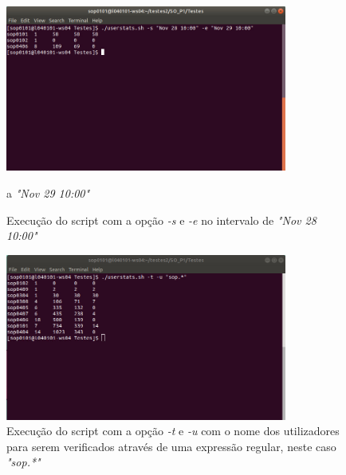 \documentclass[10pt,portuguese]{article}
\begin{document}
\begin{figure}[!h]
    \centering
    \includegraphics[width=350]{Resultados/user_s_e.jpeg}
    \caption{Execução do script com a opção \textit{-s} e \textit{-e} no intervalo de \textit{"Nov 28 10:00"}} a \textit{"Nov 29 10:00"}
\end{figure}

\begin{figure}[!h]
    \centering
    \includegraphics[width=350]{Resultados/user_t_u.jpeg}
    \caption{Execução do script com a opção \textit{-t} e \textit{-u} com o nome dos utilizadores para serem verificados através de uma expressão regular, neste caso \textit{"sop.*"}}
\end{figure}
\end{document}
